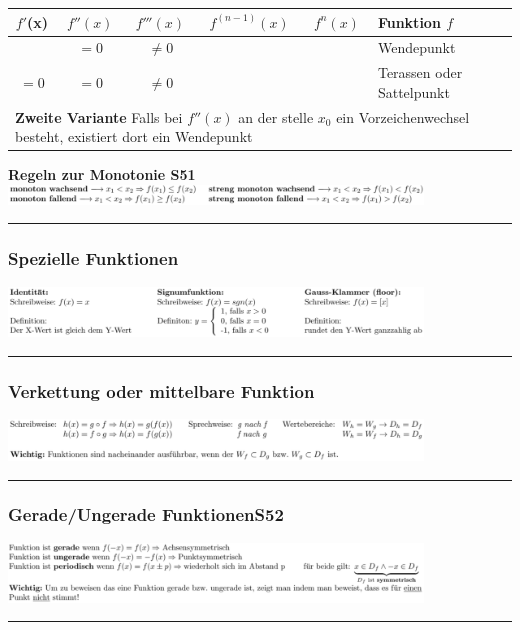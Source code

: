\begin{tabular}{|c|c|c|c|c|l|}
	\hline
	$f'$(x) & $f''(x)$ & $f'''(x)$ & $f^{(n-1)}(x)$ & $f^{n}(x)$ & Funktion $f$\\
	\hline
	& $=0$ & $\neq0$ &&& Wendepunkt\\
	\hline
	$=0$ & $=0$ & $\neq0$ &&& Terassen oder Sattelpunkt\\
	\hline
	\multicolumn{6}{|l|}{\textbf{Zweite Variante} Falls bei $f''(x)$ an der stelle $x_{0}$ ein Vorzeichenwechsel besteht, existiert dort ein Wendepunkt}\\
	\hline
	
\end{tabular}

\newpage

\textbf{Regeln zur Monotonie \color{red}S51}\\
\includegraphics[width=11cm]{images/Monotonie.PNG}\\
\hrule
\subsubsection{Spezielle Funktionen}
\includegraphics[width=11cm]{images/SpezFunkt.PNG}\\
\hrule
\subsubsection{Verkettung oder mittelbare Funktion}
\includegraphics[width=11cm]{images/Verkettung.PNG}\\
\hrule
\subsubsection{Gerade/Ungerade Funktionen\color{red}S52}
\includegraphics[width=11cm]{images/GrUgrFnkt.PNG}\\
\hrule
